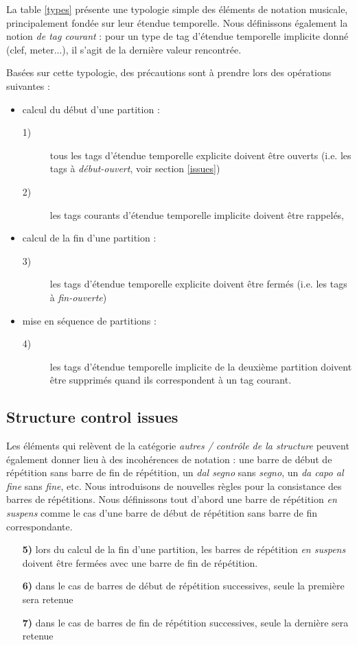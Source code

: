 \documentclass{article}
\newcommand{\oend}			{\emph{fin-ouverte}}
\newcommand{\obeg}			{\emph{début-ouvert}}
\newcommand{\rulenum}[1]	{\textbf{#1}}
\begin{document}
La table  \ref{types} présente une typologie simple des éléments de notation musicale, principalement fondée sur leur étendue temporelle. Nous définissons également la notion \emph{de tag courant} : pour un type de tag d'étendue temporelle implicite donné (clef, meter...), il s'agit de la dernière valeur rencontrée. 

Basées sur cette typologie, des précautions sont à prendre lors des opérations suivantes :

\begin{itemize}
\item calcul du début d'une partition :  
\begin{description}
	\item[1)] tous les tags d'étendue temporelle explicite doivent être ouverts (i.e. les tags à \obeg , voir section \ref{issues})
	\item[2)] les tags courants d'étendue temporelle implicite  doivent être rappelés,
\end{description}
\item calcul de la fin d'une partition : 
\begin{description}
	\item[3)] les tags d'étendue temporelle explicite doivent être fermés (i.e. les tags à \oend )
\end{description}
\item mise en séquence de partitions : 
\begin{description}
	\item[4)] les tags d'étendue temporelle implicite de la deuxième partition doivent être supprimés quand ils correspondent à un tag courant.
\end{description}
\end{itemize}


\subsection{Structure control issues} \label{sc}
Les éléments qui relèvent de la catégorie \emph{autres / contrôle de la structure} peuvent également donner lieu à des incohérences de notation : une barre de début de répétition sans barre de fin de répétition, un \emph{dal segno} sans \emph{segno}, un \emph{da capo al fine} sans \emph{fine}, etc.
Nous introduisons de nouvelles règles pour la consistance des barres de répétitions. Nous définissons tout d'abord une barre de répétition \emph{en suspens} comme le cas d'une barre de début de répétition sans barre de fin correspondante. 
\begin{itemize}
\item[\rulenum{5)}] lors du calcul de la fin d'une partition, les barres de répétition \emph{en suspens} doivent être fermées avec une barre de fin de répétition.
\item[\rulenum{6)}] dans le cas de barres de début de répétition successives, seule la première sera retenue
\item[\rulenum{7)}] dans le cas de barres de fin de répétition successives, seule la dernière sera retenue
\end{itemize}
\end{document}
